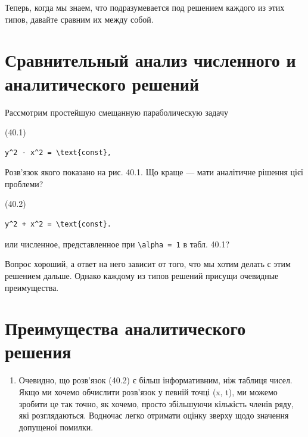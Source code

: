\documentclass[
  ukrainian,
]{article}
\providecommand{\tightlist}{%
  \setlength{\itemsep}{0pt}\setlength{\parskip}{0pt}}
\begin{document}
Теперь, когда мы знаем, что подразумевается под решением каждого из этих
типов, давайте сравним их между собой.

\section{\texorpdfstring{\textbf{Сравнительный анализ численного} и
аналитического
решений}{Сравнительный анализ численного и аналитического решений}}\label{ux441ux440ux430ux432ux43dux438ux442ux435ux43bux44cux43dux44bux439-ux430ux43dux430ux43bux438ux437-ux447ux438ux441ux43bux435ux43dux43dux43eux433ux43e-ux438-ux430ux43dux430ux43bux438ux442ux438ux447ux435ux441ux43aux43eux433ux43e-ux440ux435ux448ux435ux43dux438ux439}

Рассмотрим простейшую смещанную параболическую задачу

(40.1)

\begin{verbatim}
y^2 - x^2 = \text{const},
\end{verbatim}

Розв'язок якого показано на рис. 40.1. Що краще --- мати аналітичне
рішення цієї проблеми?

(40.2)

\begin{verbatim}
y^2 + x^2 = \text{const}.
\end{verbatim}

или численное, представленное при \texttt{\textbackslash{}alpha\ =\ 1} в
табл. 40.1?

Вопрос хороший, а ответ на него зависит от того, что мы хотим делать с
этим решением дальше. Однако каждому из типов решений присущи очевидные
преимущества.

\section{Преимущества аналитического
решения}\label{ux43fux440ux435ux438ux43cux443ux449ux435ux441ux442ux432ux430-ux430ux43dux430ux43bux438ux442ux438ux447ux435ux441ux43aux43eux433ux43e-ux440ux435ux448ux435ux43dux438ux44f}

\begin{enumerate}
\def\labelenumi{\arabic{enumi}.}
\tightlist
\item
  Очевидно, що розв'язок (40.2) є більш інформативним, ніж таблиця
  чисел. Якщо ми хочемо обчислити розв'язок у певній точці (x, t), ми
  можемо зробити це так точно, як хочемо, просто збільшуючи кількість
  членів ряду, які розглядаються. Водночас легко отримати оцінку зверху
  щодо значення допущеної помилки.
\end{enumerate}
\end{document}
